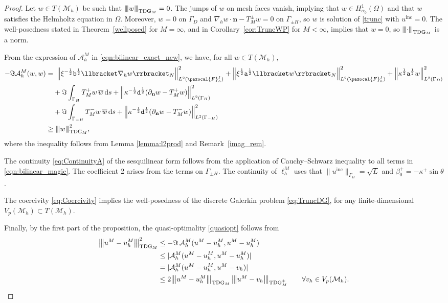 \documentclass[a4paper,10pt]{article}
\newcommand{\vertiii}[1]{{\left\vert\kern-0.25ex\left\vert\kern-0.25ex\left\vert #1 \right\vert\kern-0.25ex\right\vert\kern-0.25ex\right\vert}}
\newcommand{\bn}{{\mathbf n}}
\newcommand{\rd}{{\,\mathrm d}}
\newcommand{\inc}{{\mathrm{inc}}}
\newcommand{\Mh}{{\mathcal M_h}}
\newcommand{\cA}{{\mathcal A}}
\newcommand{\pa}{{\mathtt{a}}}
\newcommand{\pb}{{\mathtt{b}}}
\newcommand{\pd}{{\mathtt{d}}}
\newcommand{\dn}{{\partial_\bn}}
\newcommand{\cw}{{\overline{w}}}
\newcommand{\GD}{{\Gamma_D}}
\newcommand{\GH}{{\Gamma_H}}
\newcommand{\GmH}{{\Gamma_{-H}}}
\newcommand{\GpmH}{{\Gamma_{\pm H}}}
\newcommand{\FhI}{\pazocal{F}_h^I}
\begin{document}
\begin{proof}
Let $w \in T(\Mh)$ be such that $\vertiii{w}_{\mathrm{TDG}_M}= 0$.
The jumps of $w$ on mesh faces vanish, implying that $w\in H^1_{\alpha_0}(\Omega)$ and that $w$ satisfies the Helmholtz equation in $\Omega$.
Moreover, $w = 0$ on $\GD$ and $\nabla_h w \cdot \bn - T_M^\pm w = 0$ on $\GpmH$, so $w$ is solution of \eqref{trunc} with $u^{\mathrm{inc}}=0$.
The well-posedness stated in Theorem~\ref{wellposed} for $M=\infty$, and in Corollary~\ref{cor:TruncWP} for $M<\infty$, implies that $w=0$, so $\vertiii{\cdot}_{\mathrm{TDG}_M}$ is a norm.

From the expression of $\cA_h^M$ in \eqref{eqn:bilinear_exact_new},
we have, for all $w\in T(\Mh)$,
\begin{align*}
	-\Im \cA_h^M(w, w) = &\ 
	\left\| \xi^{-\frac{1}{2}} \pb^{\frac{1}{2}} \llbracket \nabla_h w \rrbracket_N \right\|^2_{L^2(\FhI)} 
	+ \left\| \xi^{\frac{1}{2}}\pa^{\frac{1}{2}} \llbracket w \rrbracket_N \right\|^2_{L^2(\FhI)}
	+\left\| \kappa^{\frac{1}{2}} \pa^{\frac{1}{2}} w \right\|^2_{L^2(\GD)}\\
	& + \Im \int_\GH T_M^+ w \, \cw \rd s 
	+ \left\| \kappa^{-\frac{1}{2}} \pd^{\frac{1}{2}} ( \partial_\bn w - T_M^+ w ) \right\|^2_{L^2(\GH)}\\
	& + \Im \int_\GmH T_M^- w \, \cw \rd s 
	+ \left\| \kappa^{-\frac{1}{2}} \pd^{\frac{1}{2}} ( \partial_\bn w - T_M^- w ) \right\|^2_{L^2(\GmH)}\\ \ge &\ %
	\vertiii{w}^2_{\mathrm{TDG}_M},
\end{align*}
where the inequality follows from Lemma \ref{lemma:l2prod} and Remark~\ref{imag_rem}.

The continuity \eqref{eq:ContinuityA} of the sesquilinear form follows from the application of Cauchy--Schwarz inequality to all terms in \eqref{eqn:bilinear_magic}. 
The coefficient 2 arises from the terms on $\GpmH$. %
The continuity of $\ell_h^M$ uses that $\|u^\inc\|_{\GH}=\sqrt L$ and $\beta_0^+=-\kappa^+\sin\theta$.

The coercivity \eqref{eq:Coercivity} implies the well-posedness of the discrete Galerkin problem \eqref{eq:TruncDG}, for any finite-dimensional $V_p(\Mh)\subset T(\Mh)$.

Finally, by the first part of the proposition, the quasi-optimality \eqref{quasiopt} follows from
\begin{align*}
	\vertiii{u^M - u_h^M}_{\mathrm{TDG}_M}^2 & \leq -\Im \, \cA_h^M (u^M - u_h^M, u^M - u_h^M) \\
	& \leq | \cA_h^M (u^M - u_h^M, u^M - u_h^M) | \\
	& = | \cA_h^M (u^M - u_h^M, u^M - v_h) | \\
	& \leq 2 \vertiii{u^M - u_h^M}_{\mathrm{TDG}_M} \, \vertiii{u^M - v_h}_{\mathrm{TDG}_M^+}
	\qquad \forall v_h\in V_p(\Mh).
\end{align*}
\end{proof}
\end{document}

